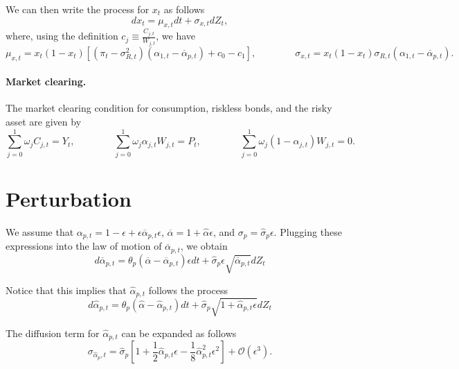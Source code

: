 We can then write the process for $x_t$ as follows
\begin{equation}
    d x_t = \mu_{x,t} dt + \sigma_{x,t} d Z_t,
\end{equation}
where, using the definition $c_{j} \equiv \frac{C_{j,t}}{W_{j,t}}$, we have
\begin{equation}
    \mu_{x,t} = x_t(1-x_t) \left[ (\pi_t-\sigma_{R,t}^2) \left( \alpha_{1,t} - \overline{\alpha}_{p,t} \right) + c_0 - c_1 \right], \qquad \qquad 
    \sigma_{x,t} = x_t (1-x_t) \sigma_{R,t} \left( \alpha_{1,t} - \overline{\alpha}_{p,t}\right).
\end{equation}



\paragraph{Market clearing.} The market clearing condition for consumption, riskless bonds, and the risky asset are given by
\begin{equation}
    \sum_{j=0}^1 \omega_j C_{j,t} = Y_t, \qquad \qquad 
    \sum_{j=0}^1 \omega_j \alpha_{j,t} W_{j,t} = P_t, \qquad  \qquad 
    \sum_{j=0}^1 \omega_j (1-\alpha_{j,t}) W_{j,t} = 0.
\end{equation}

\section{Perturbation}

We assume that $\alpha_{p,t} = 1 -\epsilon + \epsilon \overline{\alpha}_{p,t} \epsilon$, $\overline{\alpha} = 1 + \hat{\alpha} \epsilon$, and $\sigma_p = \hat{\sigma}_p \epsilon $. Plugging these expressions into the law of motion of $\overline{\alpha}_{p,t}$, we obtain
\begin{equation}
    d \overline{\alpha}_{p,t}  = \theta_p ( \overline{\alpha} - \overline{\alpha}_{p,t}) \epsilon dt + \hat{\sigma}_p \epsilon \sqrt{\overline{\alpha}_{p,t} } d Z_t
\end{equation}

Notice that this implies that $\hat{\alpha}_{p,t}$ follows the process
\begin{equation}
    d \hat{\alpha}_{p,t} = \theta_p ( \hat{\alpha} -\hat{\alpha}_{p,t}) dt + \hat{\sigma}_p \sqrt{1 + \hat{\alpha}_{p,t} \epsilon } d Z_t
\end{equation}

The diffusion term for $\hat{\alpha}_{p,t}$ can be expanded as follows
\begin{equation}
    \sigma_{\hat{\alpha}_p,t} = \hat{\sigma}_p \left[ 1 + \frac{1}{2} \hat{\alpha}_{p,t} \epsilon - \frac{1}{8} \hat{\alpha}_{p,t}^2 \epsilon^2 \right] + \mathcal{O}(\epsilon^3).
\end{equation}


